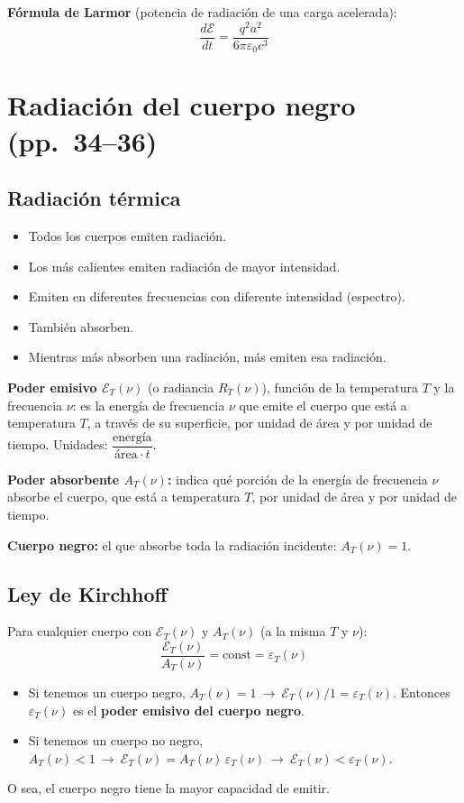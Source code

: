 \documentclass[11pt,a4paper]{article}
\newcommand{\pags}[1]{{\normalfont\small\color{gris}(pp.~#1)}}
\newcommand{\Ep}{\mathcal{E}}
\begin{document}
\textbf{Fórmula de Larmor} (potencia de radiación de una carga acelerada):
\[
\frac{d\Ep}{dt}=\frac{q^2a^2}{6\pi\varepsilon_0c^3}
\]

\section{Radiación del cuerpo negro \pags{34--36}}

\subsection{Radiación térmica}
\begin{itemize}
  \item Todos los cuerpos emiten radiación.
  \item Los más calientes emiten radiación de mayor intensidad.
  \item Emiten en diferentes frecuencias con diferente intensidad (espectro).
  \item También absorben.
  \item Mientras más absorben una radiación, más emiten esa radiación.
\end{itemize}

\textbf{Poder emisivo $\Ep_T(\nu)$} (o radiancia $R_T(\nu)$), función de la temperatura $T$ y la frecuencia $\nu$:
es la energía de frecuencia $\nu$ que emite el cuerpo que está a temperatura $T$, a través de su superficie,
por unidad de área y por unidad de tiempo. Unidades: $\dfrac{\text{energía}}{\text{área}\cdot t}$.

\textbf{Poder absorbente $A_T(\nu)$:} indica qué porción de la energía de frecuencia $\nu$ absorbe el cuerpo,
que está a temperatura $T$, por unidad de área y por unidad de tiempo.

\textbf{Cuerpo negro:} el que absorbe toda la radiación incidente: $A_T(\nu)=1$.

\subsection{Ley de Kirchhoff}
Para cualquier cuerpo con $\Ep_T(\nu)$ y $A_T(\nu)$ (a la misma $T$ y $\nu$):
\[
\frac{\Ep_T(\nu)}{A_T(\nu)}=\text{const}=\varepsilon_T(\nu)
\]
\begin{itemize}
  \item Si tenemos un cuerpo negro, $A_T(\nu)=1\ \rightarrow\ \Ep_T(\nu)/1=\varepsilon_T(\nu)$.
        Entonces $\varepsilon_T(\nu)$ es el \textbf{poder emisivo del cuerpo negro}.
  \item Si tenemos un cuerpo no negro, $A_T(\nu)<1\ \rightarrow\ \Ep_T(\nu)=A_T(\nu)\,\varepsilon_T(\nu)\ \rightarrow\ \Ep_T(\nu)<\varepsilon_T(\nu)$.
\end{itemize}
O sea, el cuerpo negro tiene la mayor capacidad de emitir.
\end{document}
